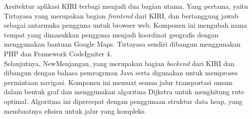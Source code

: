 \noindent
Arsitektur aplikasi KIRI terbagi menjadi dua bagian utama. Yang pertama, yaitu Tirtayasa yang merupakan bagian \textit{frontend} dari KIRI, dan bertanggung jawab sebagai antarmuka pengguna untuk browser web. Komponen ini mengubah nama tempat yang dimasukkan pengguna menjadi koordinat geografis dengan menggunakan bantuan Google Maps. Tirtayasa sendiri dibangun menggunakan PHP dan Framework CodeIgniter 4.
\\
Selanjutnya, NewMenjangan, yang merupakan bagian \textit{backend} dari KIRI dan dibangun dengan bahasa pemrogrman Java serta digunakan untuk memproses permintaan navigasi. Komponen ini memuat semua jalur transportasi umum dalam bentuk graf dan menggunakan algoritma Dijkstra untuk menghitung rute optimal. Algoritma ini dipercepat dengan penggunaan struktur data heap, yang membuatnya efisien untuk jalur yang kompleks.

